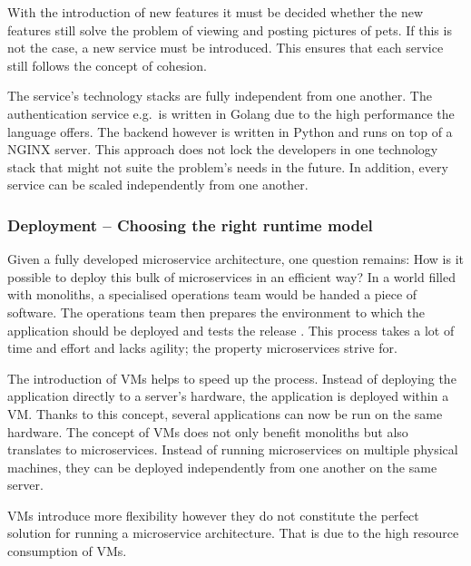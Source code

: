 With the introduction of new features it must be decided whether the new
features still solve the problem of viewing and posting pictures of pets. If
this is not the case, a new service must be introduced. This ensures that each
service still follows the concept of cohesion.

The service's technology stacks are fully independent from one another. The
authentication service e.g.\ is written in Golang due to the high performance
the language offers. The backend however is written in Python and runs on top
of a NGINX server. This approach does not lock the developers in one technology
stack that might not suite the problem's needs in the future. In addition,
every service can be scaled independently from one another.

\subsubsection{Deployment -- Choosing the right runtime model}%
\label{ssub:Deployment_Runtime_Model}

Given a fully developed microservice architecture, one question remains: How is
it possible to deploy this bulk of microservices in an efficient way? In a
world filled with monoliths, a specialised operations team would be handed a
piece of software. The operations team then prepares the environment to which
the application should be deployed and tests the release
\autocite{VillamizarEvaluatingmonolithicmicroservice2015}. This process takes a
lot of time and effort and lacks agility; the property microservices strive
for.

The introduction of \acp{VM} helps to speed up the process. Instead of
deploying the application directly to a server's hardware, the application is
deployed within a \ac{VM}. Thanks to this concept, several applications can now
be run on the same hardware. The concept of \acp{VM} does not only benefit
monoliths but also translates to microservices. Instead of running
microservices on multiple physical machines, they can be deployed
independently from one another on the same server.

\acp{VM} introduce more flexibility however they do not constitute the perfect
solution for running a microservice architecture. That is due to the high
resource consumption of \acp{VM}.

